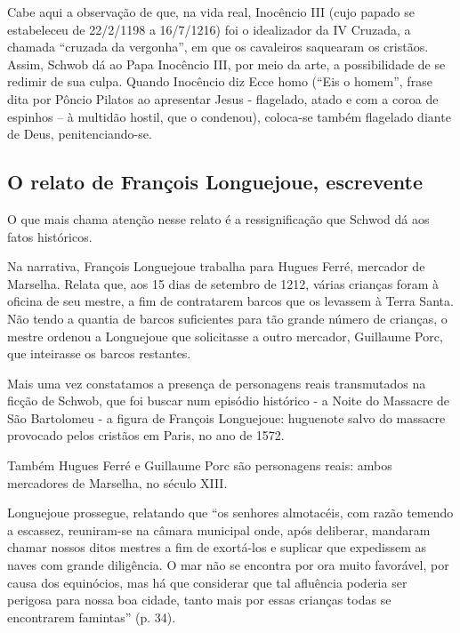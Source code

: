 \documentclass[12pt]{extarticle}
\begin{document}
Cabe aqui a observação de que, na vida real, Inocêncio III (cujo papado
se estabeleceu de 22/2/1198 a 16/7/1216) foi o idealizador da IV
Cruzada, a chamada ``cruzada da vergonha'', em que os cavaleiros
saquearam os cristãos. Assim, Schwob dá ao Papa Inocêncio III, por meio
da arte, a possibilidade de se redimir de sua culpa. Quando Inocêncio
diz Ecce homo (``Eis o homem'', frase dita por Pôncio Pilatos ao
apresentar Jesus - flagelado, atado e com a coroa de espinhos -- à
multidão hostil, que o condenou), coloca-se também flagelado diante de
Deus, penitenciando-se.




\subsection{O relato de François Longuejoue, escrevente}

O que mais chama atenção nesse relato é a ressignificação que Schwod dá
aos fatos históricos.

Na narrativa, François Longuejoue trabalha para Hugues Ferré, mercador
de Marselha. Relata que, aos 15 dias de setembro de 1212, várias
crianças foram à oficina de seu mestre, a fim de contratarem barcos que
os levassem à Terra Santa. Não tendo a quantia de barcos suficientes
para tão grande número de crianças, o mestre ordenou a Longuejoue que
solicitasse a outro mercador, Guillaume Porc, que inteirasse os barcos
restantes.

Mais uma vez constatamos a presença de personagens reais transmutados na
ficção de Schwob, que foi buscar num episódio histórico - a Noite do
Massacre de São Bartolomeu -  a figura de François Longuejoue:
huguenote salvo do massacre provocado pelos cristãos em Paris, no ano de
1572.

Também Hugues Ferré e Guillaume Porc são personagens reais: ambos
mercadores de Marselha, no século XIII.

Longuejoue prossegue, relatando que ``os senhores almotacéis, com razão
temendo a escassez, reuniram-se na câmara municipal onde, após
deliberar, mandaram chamar nossos ditos mestres a fim de exortá-los e
suplicar que expedissem as naves com grande diligência. O mar não se
encontra por ora muito favorável, por causa dos equinócios, mas há que
considerar que tal afluência poderia ser perigosa para nossa boa cidade,
tanto mais por essas crianças todas se encontrarem famintas'' (p. 34).
\end{document}
